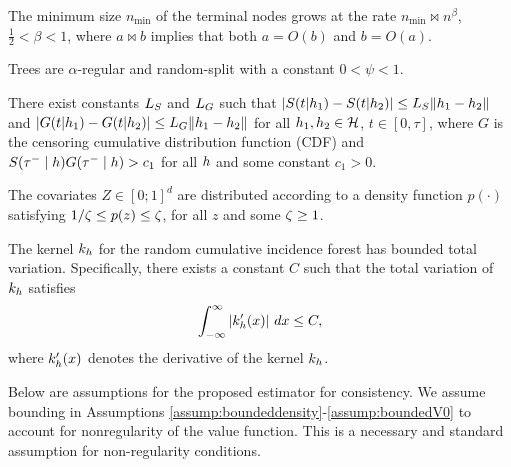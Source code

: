 \begin{assumption}
\label{assump:Cho1}
The minimum size \( n_{\text{min}} \) of the terminal nodes grows at the rate \( n_{\text{min}} \bowtie n^\beta \), \( \frac{1}{2} < \beta < 1 \), where \( a \bowtie b \) implies that both \( a = O(b) \) and \( b = O(a) \).
\end{assumption}

\begin{assumption}
\label{assump:Cho2}
Trees are \( \alpha \)-regular and random-split with a constant \( 0 < \psi < 1 \).
\end{assumption}

\begin{assumption}
\label{assump:Cho3}
There exist constants \( L_S \) and \( L_G \) such that \( |S(t | h_1) - S(t | h_2)| \leq L_S\|h_1 - h_2\| \) and \( |G(t | h_1) - G(t | h_2)| \leq L_G \|h_1 - h_2\| \) for all \( h_1, h_2 \in \mathcal{H} \), \( t \in [0, \tau] \), where \( G \) is the censoring cumulative distribution function (CDF) and \( S(\tau^- \mid h)G(\tau^- \mid h) > c_1 \) for all \( h \) and some constant \( c_1 > 0 \).
\end{assumption}

\begin{assumption}
    \label{assump:CuiAssump2}
    The covariates $Z \in [0; 1]^d$ are distributed according to a density function $p(\cdot)$ satisfying $1/\zeta \leq p(z) \leq \zeta$, for all $z$ and some $\zeta \geq 1$.
\end{assumption}

\begin{assumption}
\label{khbddtv}
The kernel \( k_h \) for the random cumulative incidence forest has bounded total variation. Specifically, there exists a constant \( C \) such that the total variation of \( k_h \) satisfies
\[
\int_{-\infty}^{\infty} \left\lvert k_h^\prime(x)\right\rvert \, dx \leq C,
\]
where \( k_h^\prime(x) \) denotes the derivative of the kernel \( k_h \).
\end{assumption}

Below are assumptions for the proposed estimator for consistency. We assume bounding in Assumptions \ref{assump:boundeddensity}-\ref{assump:boundedV0} to account for nonregularity of the value function. This is a necessary and standard assumption for non-regularity conditions.

